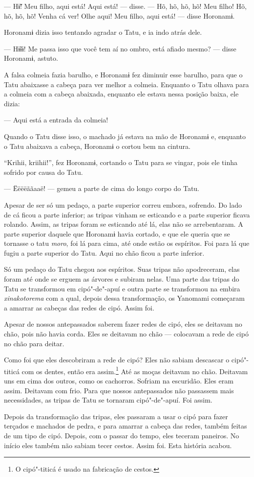 --- Hɨ̃! Meu filho, aqui está! Aqui está! --- disse. --- Hõ, hõ, hõ,
hõ! Meu filho! Hõ, hõ, hõ, hõ! Venha cá ver! Olhe aqui! Meu filho, aqui
está! --- disse Horonamɨ. 

Horonamɨ dizia isso tentando agradar o Tatu, e ia indo atrás dele. 

--- Hɨ̃ɨɨ! Me passa isso que você tem aí no ombro, está afiado
mesmo? --- disse Horonamɨ, astuto. 

A falsa colmeia fazia barulho, e Horonamɨ fez diminuir esse barulho,
para que o Tatu abaixasse a cabeça para ver melhor a colmeia. Enquanto o
Tatu olhava para a colmeia com a cabeça abaixada, enquanto ele estava
nessa posição baixa, ele dizia:

--- Aqui está a entrada da colmeia! 

Quando o Tatu disse isso, o machado já estava na mão de Horonamɨ e,
enquanto o Tatu abaixava a cabeça, Horonamɨ o cortou bem na cintura. 

``Krihii, kriihii!'', fez Horonamɨ, cortando o Tatu para se vingar, pois
ele tinha sofrido por causa do Tatu. 

--- Ëëëëããaaë! --- gemeu a parte de cima do longo corpo do Tatu. 

Apesar de ser só um pedaço, a parte superior correu embora, sofrendo. Do
lado de cá ficou a parte inferior; as tripas vinham se esticando e a
parte superior ficava rolando. Assim, as tripas foram se esticando até
lá, elas não se arrebentaram. A parte superior daquele que Horonamɨ
havia cortado, e que ele queria que se tornasse o tatu \emph{moro}, foi
lá para cima, até onde estão os espíritos. Foi para lá que fugiu a parte
superior do Tatu. Aqui no chão ficou a parte inferior. 

Só um pedaço do Tatu chegou aos espíritos. Suas tripas não apodreceram,
elas foram até onde se erguem as árvores e subiram nelas. Uma parte das
tripas do Tatu se transformou em cipó"-de"-apuí e outra parte se
transformou na embira \emph{xinakotorema} com a qual, depois dessa
transformação, os Yanomami começaram a amarrar as cabeças das redes de
cipó. Assim foi.

 

Apesar de nossos antepassados saberem fazer redes de cipó, eles se
deitavam no chão, pois não havia corda. Eles se deitavam no chão ---
colocavam a rede de cipó no chão para deitar. 

Como foi que eles descobriram a rede de cipó? Eles não sabiam descascar
o cipó"-titicá com os dentes, então era assim.\footnote{   O cipó"-titicá é usado na fabricação de cestos.}  Até as
moças deitavam no chão. Deitavam uns em cima dos outros, como os
cachorros. Sofriam na escuridão. Eles eram assim. Deitavam com frio.
Para que nossos antepassados não passassem mais necessidades, as tripas
de Tatu se tornaram cipó"-de"-apuí. Foi assim. 

Depois da transformação das tripas, eles passaram a usar o cipó para
fazer terçados e machados de pedra, e para amarrar a cabeça das redes,
também feitas de um tipo de cipó. Depois, com o passar do tempo, eles
teceram paneiros. No início eles também não sabiam tecer cestos. Assim
foi. Esta história acabou.

 
